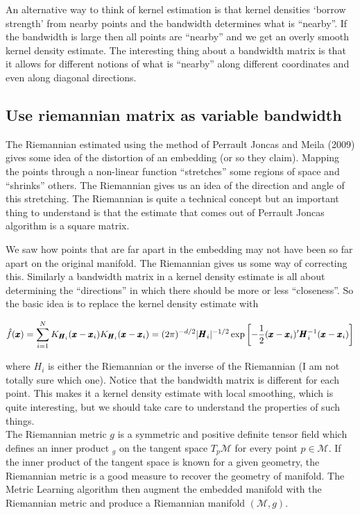 \documentclass[11pt,a4paper,]{article}
\begin{document}
An alternative way to think of kernel estimation is that kernel densities `borrow strength' from nearby points and the bandwidth determines what is ``nearby''. If the bandwidth is large then all points are ``nearby'' and we get an overly smooth kernel density estimate. The interesting thing about a bandwidth matrix is that it allows for different notions of what is ``nearby'' along different coordinates and even along diagonal directions.

\hypertarget{use-riemannian-matrix-as-variable-bandwidth}{%
\subsection{Use riemannian matrix as variable bandwidth}\label{use-riemannian-matrix-as-variable-bandwidth}}

The Riemannian estimated using the method of Perrault Joncas and Meila (2009) gives some idea of the distortion of an embedding (or so they claim). Mapping the points through a non-linear function ``stretches'' some regions of space and ``shrinks'' others. The Riemannian gives us an idea of the direction and angle of this stretching. The Riemannian is quite a technical concept but an important thing to understand is that the estimate that comes out of Perrault Joncas algorithm is a square matrix.

We saw how points that are far apart in the embedding may not have been so far apart on the original manifold. The Riemannian gives us some way of correcting this. Similarly a bandwidth matrix in a kernel density estimate is all about determining the ``directions'' in which there should be more or less ``closeness''. So the basic idea is to replace the kernel density estimate with

\[
\hat{f}(\pmb{x})=\sum\limits_{i=1}^N K_{\pmb{H}_i}(\pmb{x}-\pmb{x}_i)\\
K_{\pmb{H}_i}(\pmb{x}-\pmb{x}_i)=(2\pi)^{-d/2}|\pmb{H}_i|^{-1/2}\exp\left[-\frac{1}{2}(\pmb{x}-\pmb{x}_i)'\pmb{H}_i^{-1}(\pmb{x}-\pmb{x}_i)\right]
\]

where \(H_i\) is either the Riemannian or the inverse of the Riemannian (I am not totally sure which one). Notice that the bandwidth matrix is different for each point. This makes it a kernel density estimate with local smoothing, which is quite interesting, but we should take care to understand the properties of such things.\\

The Riemannian metric \(g\) is a symmetric and positive definite tensor field which defines an inner product \(<,>_g\) on the tangent space \(T_p\mathcal{M}\) for every point \(p \in \mathcal{M}\).
If the inner product of the tangent space is known for a given geometry, the Riemannian metric is a good measure to recover the geometry of manifold.
The Metric Learning algorithm \autocite{Perrault-Joncas2013-pq} then augment the embedded manifold with the Riemannian metric and produce a Riemannian manifold \((\mathcal{M}, g)\).
\end{document}
